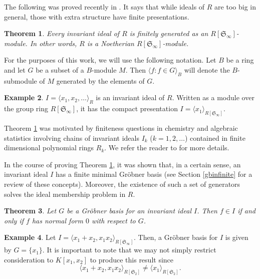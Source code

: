\documentclass{amsart}
\newtheorem{theorem}{Theorem}[section]
\theoremstyle{definition}
\newtheorem{example}[theorem]{Example}
\theoremstyle{remark}
\numberwithin{equation}{section}
\newcommand{\<}{\langle}
\renewcommand{\>}{\rangle}
\begin{document}
The following was proved recently in \cite{AH}.  It says that while ideals of $R$
are too big in general, those with extra structure have finite presentations.

\begin{theorem}\label{onevarfinitegenthm}
Every invariant ideal of $R$ is finitely generated as an $R[ {\mathfrak S}_{\infty}]$-module.  
In other words, $R$ is a Noetherian $R[{\mathfrak S}_{\infty}]$-module.
\end{theorem}


For the purposes of this work, we will use the following notation.
Let $B$ be a ring and let $G$ be a subset of a $B$-module $M$.  Then
$\<f: f \in G \>_{B}$ will denote the $B$-submodule of $M$ generated
by the elements of $G$.


\begin{example}
$I = \<x_1,x_2,\ldots\>_R$ is an invariant ideal of $R$.  Written as 
a module over the group ring $R[{\mathfrak S}_{\infty}]$, it has the
compact presentation $I= \<x_1\>_{R[{\mathfrak S}_{\infty}]}$.
\end{example}

Theorem \ref{onevarfinitegenthm} was motivated by finiteness questions in
chemistry \cite{Ruch1,Ruch2, Ruch3} and algebraic statistics \cite{SturmSull} 
involving chains of invariant ideals $I_k$ ($k = 1,2,\ldots$)
contained in finite dimensional polynomial rings $R_k$. 
We refer the reader to \cite{AH} for more details.

In the course of proving Theorem \ref{onevarfinitegenthm}, it was shown that,
in a certain sense, an invariant ideal $I$ has a finite
minimal Gr\"obner basis (see Section \ref{gbinfinite} for a review of these
concepts).  Moreover, the existence of such a set of generators solves
the ideal membership problem in $R$.  

\begin{theorem}
Let $G$ be a Gr\"obner basis for an invariant ideal $I$.  Then $f \in I$ 
if and only if $f$ has normal form $0$ with respect to $G$.
\end{theorem}

\begin{example}\label{trunccounterex}
Let $I = \<x_1 + x_2, x_1 x_2\>_{R[{\mathfrak S}_{\infty}]}$.  Then, a
Gr\"obner basis for $I$ is given by $G = \{x_1\}$.  It is important to note that we may not 
simply restrict consideration to $K[x_1,x_2]$ to produce this result since
\[  \<x_1 + x_2, x_1 x_2\>_{R[{\mathfrak S}_{2}]} \neq  \<x_1\>_{R[{\mathfrak S}_{2}]}.\]
\end{example}
\end{document}
